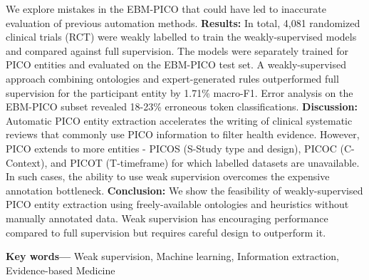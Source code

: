 \documentclass[10.7pt,]{article}
\providecommand{\keywords}[1]
{
  \small	
  \textbf{Key words---} #1
}
\begin{document}
We explore mistakes in the EBM-PICO that could have led to inaccurate evaluation of previous automation methods.
\textbf{Results:}
In total, 4,081 randomized clinical trials (RCT) were weakly labelled to train the weakly-supervised models and compared against full supervision.
The models were separately trained for PICO entities and evaluated on the EBM-PICO test set.
A weakly-supervised approach combining ontologies and expert-generated rules outperformed full supervision for the participant entity by 1.71\% macro-F1.
Error analysis on the EBM-PICO subset revealed 18-23\% erroneous token classifications.
\textbf{Discussion:}
Automatic PICO entity extraction accelerates the writing of clinical systematic reviews that commonly use PICO information to filter health evidence.
However, PICO extends to more entities - PICOS (S-Study type and design), PICOC (C-Context), and PICOT (T-timeframe) for which labelled datasets are unavailable.
In such cases, the ability to use weak supervision overcomes the expensive annotation bottleneck.
\textbf{Conclusion:}
We show the feasibility of weakly-supervised PICO entity extraction using freely-available ontologies and heuristics without manually annotated data. Weak supervision has encouraging performance compared to full supervision but requires careful design to outperform it. 


\keywords{Weak supervision, Machine learning, Information extraction, Evidence-based Medicine}


%
\clearpage
%
\end{document}
